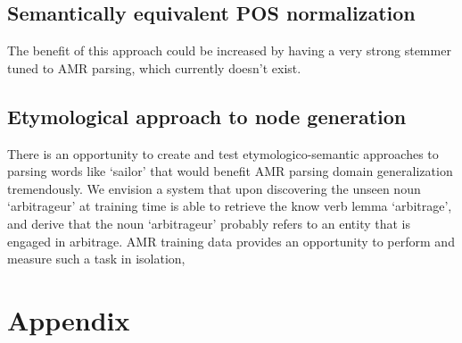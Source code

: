 \documentclass[11pt]{article}
\begin{document}
\subsection{Semantically equivalent POS normalization}
The benefit of this approach could be increased by having a very strong stemmer tuned to AMR parsing, which currently doesn't exist.
\subsection{Etymological approach to node generation}
There is an opportunity to create and test etymologico-semantic approaches to parsing words like `sailor' that would benefit AMR parsing domain generalization tremendously. We envision a system that upon discovering the unseen noun `arbitrageur' at training time is able to retrieve the know verb lemma `arbitrage', and derive that the noun `arbitrageur' probably refers to an entity that is engaged in arbitrage. AMR training data provides an opportunity to perform and measure such a task in isolation, 

\section{Appendix}
\end{document}
